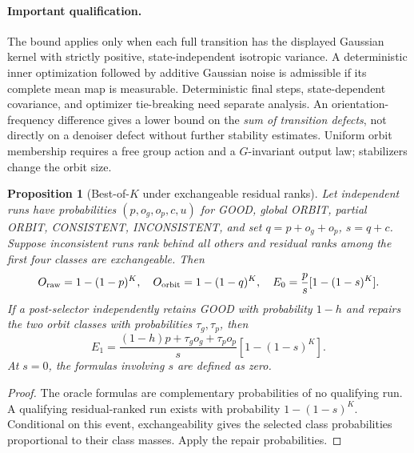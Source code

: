 \documentclass[11pt]{article}
\newtheorem{proposition}{Proposition}
\begin{document}
\paragraph{Important qualification.} The bound applies only when each full transition has the displayed Gaussian kernel with strictly positive, state-independent isotropic variance. A deterministic inner optimization followed by additive Gaussian noise is admissible if its complete mean map is measurable. Deterministic final steps, state-dependent covariance, and optimizer tie-breaking need separate analysis. An orientation-frequency difference gives a lower bound on the \emph{sum of transition defects}, not directly on a denoiser defect without further stability estimates. Uniform orbit membership requires a free group action and a $G$-invariant output law; stabilizers change the orbit size.
\begin{proposition}[Best-of-$K$ under exchangeable residual ranks]
Let independent runs have probabilities $(p,o_g,o_p,c,u)$ for GOOD, global ORBIT, partial ORBIT, CONSISTENT, INCONSISTENT, and set $q=p+o_g+o_p$, $s=q+c$. Suppose inconsistent runs rank behind all others and residual ranks among the first four classes are exchangeable. Then
\[
O_{\rm raw}=1-(1-p)^K,\quad O_{\rm orbit}=1-(1-q)^K,\quad
E_0=\frac p s[1-(1-s)^K].
\]
If a post-selector independently retains GOOD with probability $1-h$ and repairs the two orbit classes with probabilities $\tau_g,\tau_p$, then
\[
E_1=\frac{(1-h)p+\tau_g o_g+\tau_p o_p}{s}[1-(1-s)^K].
\]
At $s=0$, the formulas involving $s$ are defined as zero.
\end{proposition}
\begin{proof}The oracle formulas are complementary probabilities of no qualifying run. A qualifying residual-ranked run exists with probability $1-(1-s)^K$. Conditional on this event, exchangeability gives the selected class probabilities proportional to their class masses. Apply the repair probabilities.\end{proof}
\end{document}
